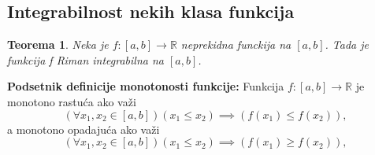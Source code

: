 \documentclass{article}
\newtheorem{teorema}{Teorema}[section]
\begin{document}
\subsection{Integrabilnost nekih klasa funkcija}
\begin{teoremabox}
    \begin{teorema}
        Neka je $f: [a, b] \longrightarrow \mathbb{R}$ neprekidna funckija na $[a, b]$. Tada je funkcija f Riman integrabilna na $[a, b]$.
    \end{teorema}
\end{teoremabox}

\begin{defbox}
    \textbf{Podsetnik definicije monotonosti funkcije:} Funkcija $f:[a,b]\longrightarrow\mathbb{R}$
    je monotono rastuća ako važi
    $$(\forall x_1,x_2\in[a,b])(x_1\leq x_2)\implies (f(x_1)\leq f(x_2)),$$
    a monotono opadajuća ako važi
    $$(\forall x_1,x_2\in[a,b])(x_1\leq x_2)\implies (f(x_1)\geq f(x_2)),$$
\end{defbox}
\end{document}
